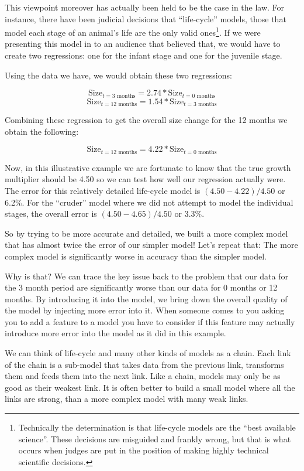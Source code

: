 \documentclass[]{memoir}
\begin{document}
This viewpoint moreover has actually been held to be the case in the
law. For instance, there have been judicial decisions that
``life-cycle'' models, those that model each stage of an animal's life
are the only valid ones\footnote{Technically the determination is that
  life-cycle models are the ``best available science''. These decisions
  are misguided and frankly wrong, but that is what occurs when judges
  are put in the position of making highly technical scientific
  decisions.}. If we were presenting this model in to an audience that
believed that, we would have to create two regressions: one for the
infant stage and one for the juvenile stage.

Using the data we have, we would obtain these two regressions:

\[ \text{Size}_{t=\text{3 months}} = 2.74 * \text{Size}_{t=\text{0 months}} \]
\[ \text{Size}_{t=\text{12 months}} = 1.54 * \text{Size}_{t=\text{3 months}} \]

Combining these regression to get the overall size change for the 12
months we obtain the following:

\[ \text{Size}_{t=\text{12 months}} = 4.22 * \text{Size}_{t=\text{0 months}} \]

Now, in this illustrative example we are fortunate to know that the true
growth multiplier should be 4.50 so we can test how well our regression
actually were. The error for this relatively detailed life-cycle model
is $(4.50-4.22)/4.50$ or 6.2\%. For the ``cruder'' model where we did
not attempt to model the individual stages, the overall error is
$(4.50-4.65)/4.50$ or 3.3\%.

So by trying to be more accurate and detailed, we built a more complex
model that has almost twice the error of our simpler model! Let's repeat
that: The more complex model is significantly worse in accuracy than the
simpler model.

Why is that? We can trace the key issue back to the problem that our
data for the 3 month period are significantly worse than our data for 0
months or 12 months. By introducing it into the model, we bring down the
overall quality of the model by injecting more error into it. When
someone comes to you asking you to add a feature to a model you have to
consider if this feature may actually introduce more error into the
model as it did in this example.

We can think of life-cycle and many other kinds of models as a chain.
Each link of the chain is a sub-model that takes data from the previous
link, transforms them and feeds them into the next link. Like a chain,
models may only be as good as their weakest link. It is often better to
build a small model where all the links are strong, than a more complex
model with many weak links.
\end{document}
